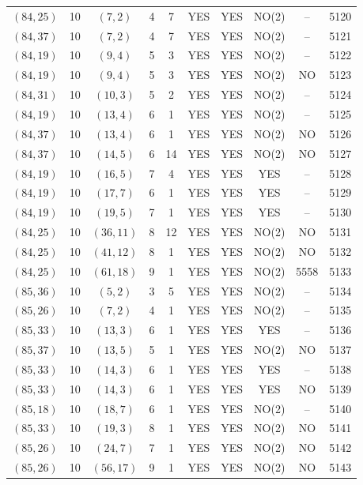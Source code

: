 \begin{longtable}{|c|c|c|c|c|c|c|c|c|c|}
$(84, 25)$ & 10 & $(7, 2)$ & 4 & 7 & YES & YES & NO(2) & -- & 5120\\
$(84, 37)$ & 10 & $(7, 2)$ & 4 & 7 & YES & YES & NO(2) & -- & 5121\\
$(84, 19)$ & 10 & $(9, 4)$ & 5 & 3 & YES & YES & NO(2) & -- & 5122\\
$(84, 19)$ & 10 & $(9, 4)$ & 5 & 3 & YES & YES & NO(2) & NO & 5123\\
$(84, 31)$ & 10 & $(10, 3)$ & 5 & 2 & YES & YES & NO(2) & -- & 5124\\
$(84, 19)$ & 10 & $(13, 4)$ & 6 & 1 & YES & YES & NO(2) & -- & 5125\\
$(84, 37)$ & 10 & $(13, 4)$ & 6 & 1 & YES & YES & NO(2) & NO & 5126\\
$(84, 37)$ & 10 & $(14, 5)$ & 6 & 14 & YES & YES & NO(2) & NO & 5127\\
$(84, 19)$ & 10 & $(16, 5)$ & 7 & 4 & YES & YES & YES & -- & 5128\\
$(84, 19)$ & 10 & $(17, 7)$ & 6 & 1 & YES & YES & YES & -- & 5129\\
$(84, 19)$ & 10 & $(19, 5)$ & 7 & 1 & YES & YES & YES & -- & 5130\\
$(84, 25)$ & 10 & $(36, 11)$ & 8 & 12 & YES & YES & NO(2) & NO & 5131\\
$(84, 25)$ & 10 & $(41, 12)$ & 8 & 1 & YES & YES & NO(2) & NO & 5132\\
$(84, 25)$ & 10 & $(61, 18)$ & 9 & 1 & YES & YES & NO(2) & 5558 & 5133\\
$(85, 36)$ & 10 & $(5, 2)$ & 3 & 5 & YES & YES & NO(2) & -- & 5134\\
$(85, 26)$ & 10 & $(7, 2)$ & 4 & 1 & YES & YES & NO(2) & -- & 5135\\
$(85, 33)$ & 10 & $(13, 3)$ & 6 & 1 & YES & YES & YES & -- & 5136\\
$(85, 37)$ & 10 & $(13, 5)$ & 5 & 1 & YES & YES & NO(2) & NO & 5137\\
$(85, 33)$ & 10 & $(14, 3)$ & 6 & 1 & YES & YES & YES & -- & 5138\\
$(85, 33)$ & 10 & $(14, 3)$ & 6 & 1 & YES & YES & YES & NO & 5139\\
$(85, 18)$ & 10 & $(18, 7)$ & 6 & 1 & YES & YES & NO(2) & -- & 5140\\
$(85, 33)$ & 10 & $(19, 3)$ & 8 & 1 & YES & YES & NO(2) & NO & 5141\\
$(85, 26)$ & 10 & $(24, 7)$ & 7 & 1 & YES & YES & NO(2) & NO & 5142\\
$(85, 26)$ & 10 & $(56, 17)$ & 9 & 1 & YES & YES & NO(2) & NO & 5143\\

\end{longtable}
